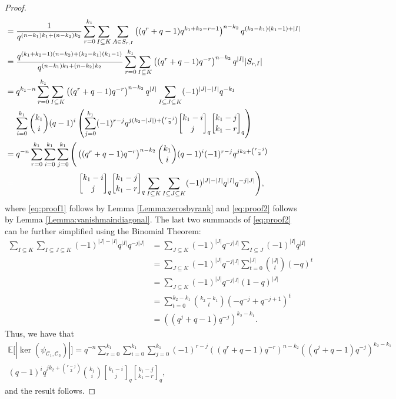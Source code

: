 \documentclass[a4paper,11pt,reqno]{article}
\newcommand{\C}{\mathcal{C}}
\newcommand{\qbinom}[2]{\genfrac[]{0pt}{0}{#1}{#2}}
\theoremstyle{plain} \numberwithin{equation}{section}
\theoremstyle{definition}
\begin{document}
\begin{proof}
\begin{align}
         &=  \frac{1}{q^{(n-k_1)k_1+(n-k_2)k_2}}\sum_{r=0}^{k_1}\sum_{I \subseteq K}\sum_{A \in S_{r,I}} \left((q^r +q-1)q^{k_1+k_2-r-1}\right)^{n-k_2} q^{(k_2-k_1)(k_1-1) +|I|}\notag \\
      &= \frac{q^{(k_1+k_2-1)(n-k_2)+(k_2-k_1)(k_1-1)}}{q^{(n-k_1)k_1+(n-k_2)k_2}} \sum_{r=0}^{k_1}\sum_{I \subseteq K} \left((q^r +q-1)q^{-r}\right)^{n-k_2} q^{|I|}|S_{r,I}| \notag \\
      &= q^{k_1-n}\sum_{r=0}^{k_1}\sum_{I \subseteq K} \left((q^r +q-1)q^{-r}\right)^{n-k_2} q^{|I|}\sum_{I \subseteq J \subseteq K} (-1)^{|J| - |I|}q^{-k_1} \notag \\ &\mathcolor{white}{=}\sum^{k_1}_{i=0}\binom{k_1}{i}(q-1)^i \left(\sum^{k_1}_{j=0}(-1)^{r-j}q^{j(k_2 - |J|) + \binom{r-j}{2}} \qbinom{k_1-i}{j}_q \qbinom{k_1-j}{k_1-r}_q \right) \notag \\
     &=q^{-n}\sum_{r=0}^{k_1}\sum_{i=0}^{k_1}\sum_{j=0}^{k_1} \Bigg(\left((q^r+q-1)q^{-r}\right)^{n-k_2}\binom{k_1}{i}(q-1)^i(-1)^{r-j}q^{jk_2 + \binom{r-j}{2}}  \notag\\
&\mathcolor{white}{=} \hspace{2.7cm}\qbinom{k_1-i}{j}_q\qbinom{k_1-j}{k_1-r}_q\sum_{ I \subseteq K} \sum_{I \subseteq J \subseteq K} (-1)^{|J|-|I|}q^{|I|}q^{-j|J|} \Bigg) \label{eq:proof2} ,
\end{align}
where \eqref{eq:proof1} follows by Lemma \ref{Lemma:zerosbyrank} and \eqref{eq:proof2} follows by Lemma \ref{Lemma:vanishmaindiagonal}. The last two summands of \eqref{eq:proof2} can be further simplified using the Binomial Theorem:
\begin{align*}
 \sum_{I \subseteq K} \sum_{I \subseteq J \subseteq K} (-1)^{|J|-|I|}q^{|I|}q^{-j|J|}
   &=\sum_{J \subseteq K} (-1)^{|J|}q^{-j|J|} \sum_{I \subseteq J} (-1)^{|I|} q^{|I|}\\
   &= \sum_{J \subseteq K} (-1)^{|J|}q^{-j|J|} \sum_{t=0}^{|J|} \binom{|J|}{t}(-q)^{t}\\
   &= \sum_{J \subseteq K} (-1)^{|J|}q^{-j|J|} (1-q)^{|J|}\\
   &= \sum_{t=0}^{k_2-k_1}\binom{k_2-k_1}{t}(-q^{-j} + q^{-j+1})^{t}\\
   &= ((q^j+q-1)q^{-j})^{k_2-k_1}.
\end{align*}
Thus, we have that
\begin{multline*}
 \mathbb{E}\big[|\ker(\psi_{\C_1,\C_2})|\big]  = q^{-n} \sum_{r=0}^{k_1}\sum_{i=0}^{k_1}\sum_{j=0}^{k_1}(-1)^{r-j}\left((q^r +q-1)q^{-r}\right)^{n-k_2}((q^j+q-1)q^{-j})^{k_2-k_1}  \\ (q-1)^iq^{jk_2 + \binom{r-j}{2}}\binom{k_1}{i}\qbinom{k_1-i}{j}_q \qbinom{k_1-j}{k_1-r}_q,
\end{multline*}
and the result follows.
\end{proof}
\end{document}
